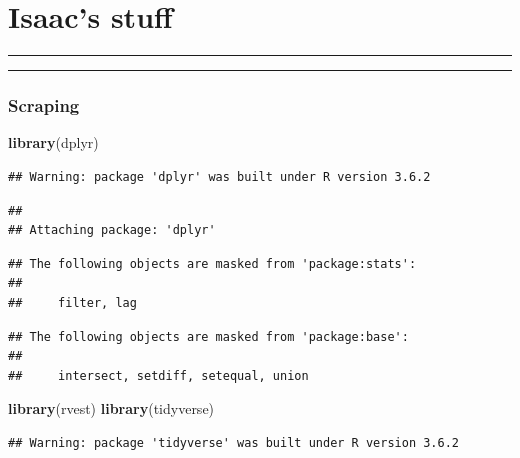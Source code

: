 \documentclass[]{article}
\title{}
\author{}
\date{}
\newenvironment{Shaded}{\begin{snugshade}}{\end{snugshade}}
\newcommand{\KeywordTok}[1]{\textcolor[rgb]{0.13,0.29,0.53}{\textbf{#1}}}
\newcommand{\NormalTok}[1]{#1}
\begin{document}
\hypertarget{isaacs-stuff}{%
\section{Isaac's stuff}\label{isaacs-stuff}}

\begin{center}\rule{0.5\linewidth}{\linethickness}\end{center}

\begin{center}\rule{0.5\linewidth}{\linethickness}\end{center}

\hypertarget{scraping}{%
\subsubsection{Scraping}\label{scraping}}

\begin{Shaded}
\begin{Highlighting}[]
\KeywordTok{library}\NormalTok{(dplyr)}
\end{Highlighting}
\end{Shaded}

\begin{verbatim}
## Warning: package 'dplyr' was built under R version 3.6.2
\end{verbatim}

\begin{verbatim}
## 
## Attaching package: 'dplyr'
\end{verbatim}

\begin{verbatim}
## The following objects are masked from 'package:stats':
## 
##     filter, lag
\end{verbatim}

\begin{verbatim}
## The following objects are masked from 'package:base':
## 
##     intersect, setdiff, setequal, union
\end{verbatim}

\begin{Shaded}
\begin{Highlighting}[]
\KeywordTok{library}\NormalTok{(rvest)}
\KeywordTok{library}\NormalTok{(tidyverse)}
\end{Highlighting}
\end{Shaded}

\begin{verbatim}
## Warning: package 'tidyverse' was built under R version 3.6.2
\end{verbatim}
\end{document}
